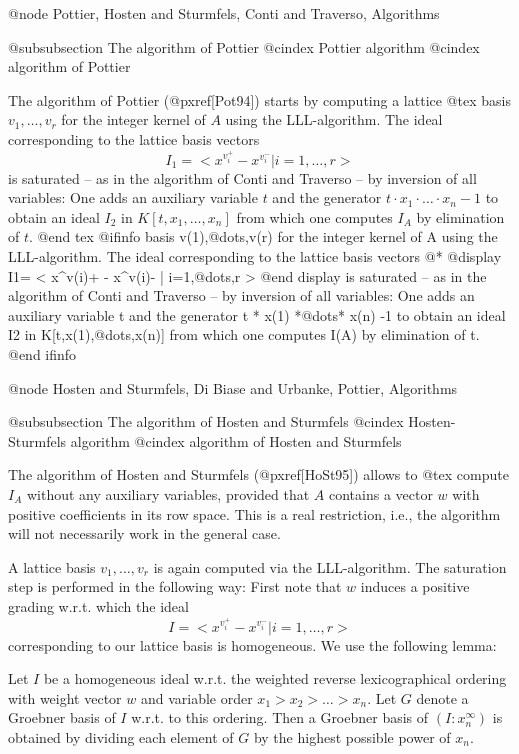 @node Pottier, Hosten and Sturmfels, Conti and Traverso, Algorithms

@subsubsection The algorithm of Pottier
@cindex Pottier algorithm
@cindex algorithm of Pottier


The algorithm of Pottier (@pxref{[Pot94]}) starts by computing a lattice
@tex
basis $v_1,\ldots,v_r$ for the integer kernel of $A$ using the
LLL-algorithm. The ideal corresponding to the lattice basis vectors
$$ I_1=<x^{v_i^+}-x^{v_i^-}|i=1,\ldots,r> $$
is saturated -- as in the algorithm of Conti and Traverso -- by
inversion of all variables: One adds an auxiliary variable $t$ and the
generator $t\cdot x_1\cdot\ldots\cdot x_n -1$ to obtain an ideal $I_2$
in $K[t,x_1,\ldots,x_n]$ from which one computes $I_A$ by elimination of
$t$.
@end tex
@ifinfo
basis v(1),@dots{},v(r) for the integer kernel of A using the
LLL-algorithm. The ideal corresponding to the lattice basis vectors @*
@display
I1= < x^v(i)+ - x^v(i)- | i=1,@dots{},r >
@end display
is saturated -- as in the algorithm of Conti and Traverso -- by
inversion of all variables: One adds an auxiliary variable t and the
generator t * x(1) *@dots{}* x(n) -1 to obtain an ideal I2 in
K[t,x(1),@dots{},x(n)] from which one computes I(A) by elimination of
t.
@end ifinfo


@node Hosten and Sturmfels, Di Biase and Urbanke, Pottier, Algorithms

@subsubsection The algorithm of Hosten and Sturmfels
@cindex Hosten-Sturmfels algorithm
@cindex algorithm of Hosten and Sturmfels


The algorithm of Hosten and Sturmfels (@pxref{[HoSt95]}) allows to
@tex
compute $I_A$ without any auxiliary variables, provided that $A$ contains a vector $w$
with positive coefficients in its row space. This is a real restriction,
i.e., the algorithm will not necessarily work in the general case.

A lattice basis $v_1,\ldots,v_r$ is again computed via the
LLL-algorithm. The saturation step is performed in the following way:
First note that $w$ induces a positive grading w.r.t. which the ideal
$$ I=<x^{v_i^+}-x^{v_i^-}|i=1,\ldots,r> $$
corresponding to our lattice basis is homogeneous. We use the following
lemma:

Let $I$ be a homogeneous ideal w.r.t. the weighted reverse
lexicographical ordering with weight vector $w$ and variable order $x_1
> x_2 > \ldots > x_n$. Let $G$ denote a Groebner basis of $I$ w.r.t. to
this ordering.  Then a Groebner basis of $(I:x_n^\infty)$ is obtained by
dividing each element of $G$ by the highest possible power of $x_n$.

